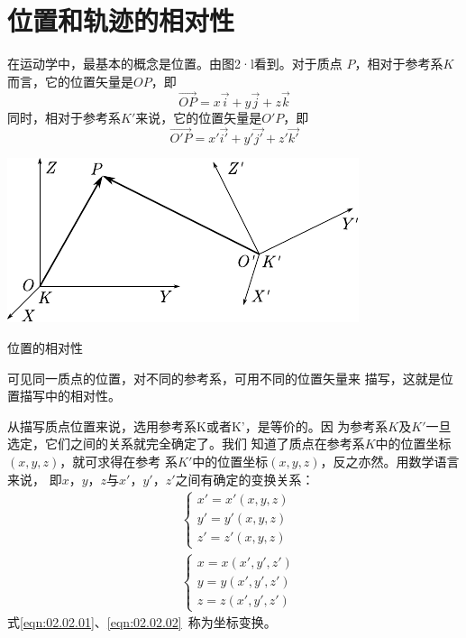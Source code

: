 \section{位置和轨迹的相对性}\label{sec:02.01}
在运动学中，最基本的概念是位置。由图2·l看到。对于质点
$P$，相对于参考系$K$而言，它的位置矢量是$OP$，即
\begin{equation*}
    \vec{OP}=x\vec{i}+y\vec{j}+z\vec{k}
\end{equation*}
同时，相对于参考系$K'$来说，它的位置矢量是$O'P$，即
\begin{equation*}
    \vec{O'P}=x'\vec{i'}+y'\vec{j'}+z'\vec{k'}
\end{equation*}
\begin{figurex}
    \centering
    \includegraphics{figure/fig02.01}
    \caption{位置的相对性}
    \label{fig:02.01}
\end{figurex}

可见同一质点的位置，对不同的参考系，可用不同的位置矢量来
描写，这就是位置描写中的相对性。

从描写质点位置来说，选用参考系K或者K'，是等价的。因
为参考系$K$及$K'$一旦选定，它们之间的关系就完全确定了。我们
知道了质点在参考系$K$中的位置坐标$(x,y,z)$，就可求得在参考
系$K'$中的位置坐标$(x,y,z)$，反之亦然。用数学语言来说，
即$x$，$y$，$z$与$x'$，$y'$，$z'$之间有确定的变换关系：
\begin{align}
    \label{eqn:02.02.01}
    &\left\{\begin{array}{l}
        x'=x'(x, y, z) \\
        y'=y'(x, y, z) \\
        z'=z'(x, y, z)
    \end{array}\right. \\
    \label{eqn:02.02.02}
    &\left\{\begin{array}{l}
    x=x(x', y', z') \\
    y=y(x', y', z') \\
    z=z(x', y', z')
    \end{array}\right.
\end{align}
式\eqref{eqn:02.02.01}、\eqref{eqn:02.02.02}~称为坐标变换。

